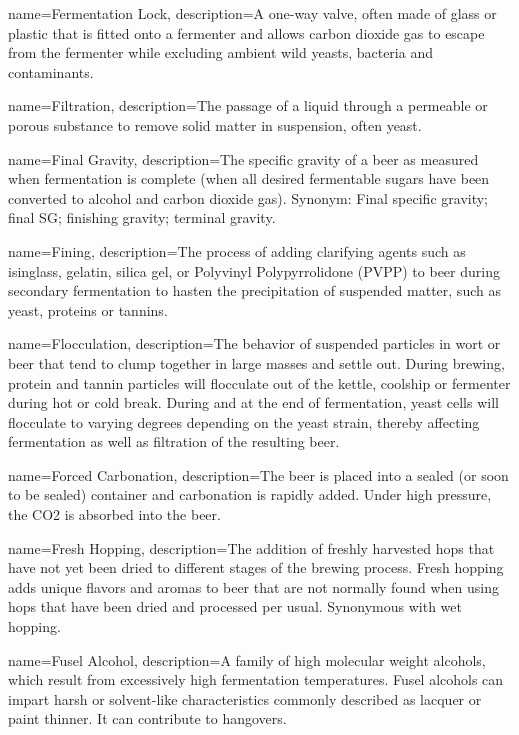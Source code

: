 {
  name={Fermentation Lock},
  description={A one-way valve, often made of glass or plastic that is fitted onto a fermenter and allows carbon dioxide gas to escape from the fermenter while excluding ambient wild yeasts, bacteria and contaminants.}
  }

{
  name={Filtration},
  description={The passage of a liquid through a permeable or porous substance to remove solid matter in suspension, often yeast.}
  }

{
  name={Final Gravity},
  description={The specific gravity of a beer as measured when fermentation is complete (when all desired fermentable sugars have been converted to alcohol and carbon dioxide gas). Synonym: Final specific gravity; final SG; finishing gravity; terminal gravity.}
  }

{
  name={Fining},
  description={The process of adding clarifying agents such as isinglass, gelatin, silica gel, or Polyvinyl Polypyrrolidone (PVPP) to beer during secondary fermentation to hasten the precipitation of suspended matter, such as yeast, proteins or tannins.}
  }

{
  name={Flocculation},
  description={The behavior of suspended particles in wort or beer that tend to clump together in large masses and settle out. During brewing, protein and tannin particles will flocculate out of the kettle, coolship or fermenter during hot or cold break. During and at the end of fermentation, yeast cells will flocculate to varying degrees depending on the yeast strain, thereby affecting fermentation as well as filtration of the resulting beer.}
  }

{
  name={Forced Carbonation},
  description={The beer is placed into a sealed (or soon to be sealed) container and carbonation is rapidly added. Under high pressure, the CO2 is absorbed into the beer.}
  }

{
  name={Fresh Hopping},
  description={The addition of freshly harvested hops that have not yet been dried to different stages of the brewing process. Fresh hopping adds unique flavors and aromas to beer that are not normally found when using hops that have been dried and processed per usual. Synonymous with wet hopping.}
  }

{
  name={Fusel Alcohol},
  description={A family of high molecular weight alcohols, which result from excessively high fermentation temperatures. Fusel alcohols can impart harsh or solvent-like characteristics commonly described as lacquer or paint thinner. It can contribute to hangovers.}
  }

